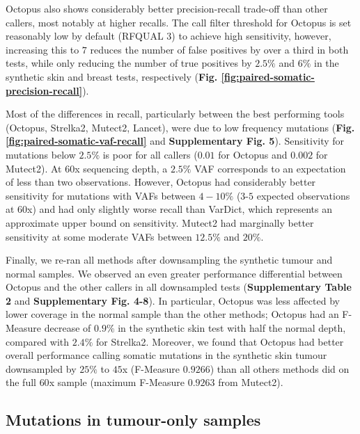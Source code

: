 \documentclass[notitlepage, twocolumn, 10pt]{article}
\begin{document}
Octopus also shows considerably better precision-recall trade-off than other callers, most notably at higher recalls. The call filter threshold for Octopus is set reasonably low by default (RFQUAL $3$) to achieve high sensitivity, however, increasing this to $7$ reduces the number of false positives by over a third in both tests, while only reducing the number of true positives by $2.5\%$ and $6\%$ in the synthetic skin and breast tests, respectively (\textbf{Fig. \ref{fig:paired-somatic-precision-recall}}).

Most of the differences in recall, particularly between the best performing tools (Octopus, Strelka2, Mutect2, Lancet), were due to low frequency mutations (\textbf{Fig. \ref{fig:paired-somatic-vaf-recall}} and \textbf{Supplementary Fig. 5}). Sensitivity for mutations below $2.5\%$ is poor for all callers ($0.01$ for Octopus and $0.002$ for Mutect2). At 60x sequencing depth, a $2.5\%$ VAF corresponds to an expectation of less than two observations. However, Octopus had considerably better sensitivity for mutations with VAFs between $4-10\%$ ($3$-$5$ expected observations at 60x) and had only slightly worse recall than VarDict, which represents an approximate upper bound on sensitivity. Mutect2 had marginally better sensitivity at some moderate VAFs between $12.5\%$ and $20\%$.

Finally, we re-ran all methods after downsampling the synthetic tumour and normal samples. We observed an even greater performance differential between Octopus and the other callers in all downsampled tests (\textbf{Supplementary Table 2} and \textbf{Supplementary Fig. 4-8}). In particular, Octopus was less affected by lower coverage in the normal sample than the other methods; Octopus had an F-Measure decrease of $0.9\%$ in the synthetic skin test with half the normal depth, compared with $2.4\%$ for Strelka2. Moreover, we found that Octopus had better overall performance calling somatic mutations in the synthetic skin tumour downsampled by $25\%$ to $45$x (F-Measure $0.9266$) than all others methods did on the full $60$x sample (maximum F-Measure $0.9263$ from Mutect2).

\subsection*{Mutations in tumour-only samples}
\end{document}
